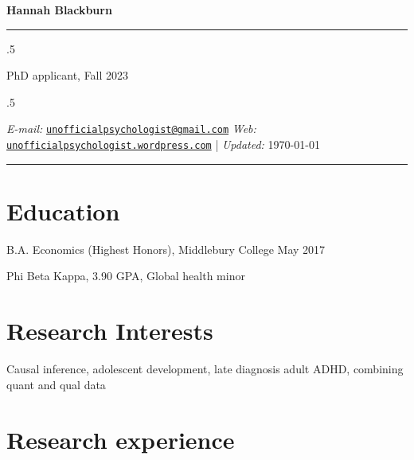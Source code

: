 \documentclass[11pt,]{article}
\providecommand{\tightlist}{%
  \setlength{\itemsep}{0pt}\setlength{\parskip}{0pt}}
\renewenvironment{itemize}{
  \begin{list}{}{
    \setlength{\leftmargin}{1.5em}
  }
}{
  \end{list}
}
\begin{document}
\centerline{\huge \bf Hannah Blackburn}

\vspace{2 mm}

\hrule

\vspace{2 mm}

\moveleft.5\hoffset\centerline{PhD applicant, Fall 2023}

\moveleft.5\hoffset\centerline{ \emph{E-mail:} \href{mailto:}{\tt \href{mailto:unofficialpsychologist@gmail.com}{\nolinkurl{unofficialpsychologist@gmail.com}}} \hspace{1 mm}     \emph{Web:} \href{http://unofficialpsychologist.wordpress.com}{\tt unofficialpsychologist.wordpress.com}    | \emph{Updated:} \today}

\vspace{2 mm}

\hrule


\hypertarget{education}{%
\section{Education}\label{education}}

\begin{itemize}
\item
  B.A. Economics (Highest Honors), Middlebury College \hfill May 2017

  \begin{itemize}
  \tightlist
  \item
    Phi Beta Kappa, 3.90 GPA, Global health minor
  \end{itemize}
\end{itemize}

\hypertarget{research-interests}{%
\section{Research Interests}\label{research-interests}}

\begin{itemize}
\tightlist
\item
  Causal inference, adolescent development, late diagnosis adult ADHD,
  combining quant and qual data
\end{itemize}

\hypertarget{research-experience}{%
\section{Research experience}\label{research-experience}}
\end{document}
